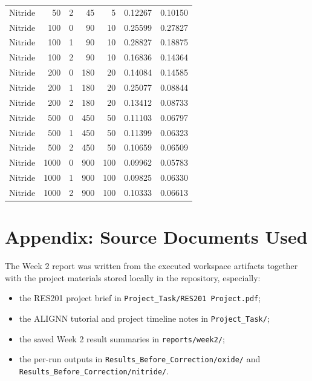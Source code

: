 \documentclass[11pt]{article}
\begin{document}
\begin{longtable}{lrrrrrr}
Nitride & 50 & 2 & 45 & 5 & 0.12267 & 0.10150 \\
Nitride & 100 & 0 & 90 & 10 & 0.25599 & 0.27827 \\
Nitride & 100 & 1 & 90 & 10 & 0.28827 & 0.18875 \\
Nitride & 100 & 2 & 90 & 10 & 0.16836 & 0.14364 \\
Nitride & 200 & 0 & 180 & 20 & 0.14084 & 0.14585 \\
Nitride & 200 & 1 & 180 & 20 & 0.25077 & 0.08844 \\
Nitride & 200 & 2 & 180 & 20 & 0.13412 & 0.08733 \\
Nitride & 500 & 0 & 450 & 50 & 0.11103 & 0.06797 \\
Nitride & 500 & 1 & 450 & 50 & 0.11399 & 0.06323 \\
Nitride & 500 & 2 & 450 & 50 & 0.10659 & 0.06509 \\
Nitride & 1000 & 0 & 900 & 100 & 0.09962 & 0.05783 \\
Nitride & 1000 & 1 & 900 & 100 & 0.09825 & 0.06330 \\
Nitride & 1000 & 2 & 900 & 100 & 0.10333 & 0.06613 \\
\bottomrule
\end{longtable}
\normalsize

\section{Appendix: Source Documents Used}
The Week 2 report was written from the executed workspace artifacts together with the project materials stored locally in the repository, especially:
\begin{itemize}
  \item the RES201 project brief in \texttt{Project\_Task/RES201 Project.pdf};
  \item the ALIGNN tutorial and project timeline notes in \texttt{Project\_Task/};
  \item the saved Week 2 result summaries in \texttt{reports/week2/};
  \item the per-run outputs in \texttt{Results_Before_Correction/oxide/} and \texttt{Results_Before_Correction/nitride/}.
\end{itemize}
\end{document}
